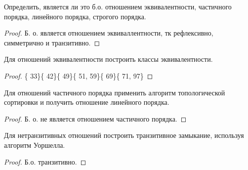 \begin{problem}
	Определить, является ли это б.о. отношением эквивалентности, частичного порядка, линейного порядка, строгого порядка.
\end{problem}

\begin{proof}
	Б. о. является отношением эквиваллентности, тк рефлексивно, симметрично и транзитивно.
\end{proof}
\begin{problem}
	Для отношений эквивалентности построить классы эквивалентности.
\end{problem}

\begin{proof}
\{ 33\}\{ 42\}\{ 49\}\{ 51, 59\}\{ 69\}\{ 71, 97\}
\end{proof}
\begin{problem}
	Для отношений частичного порядка применить алгоритм топологической сортировки и получить отношение линейного порядка.
\end{problem}

\begin{proof}
    Б. о. не является отношением частичного порядка.
\end{proof}
\begin{problem}
	Для нетранзитивных отношений построить транзитивное замыкание, используя алгоритм Уоршелла.
\end{problem}

\begin{proof}
Б.о. транзитивно.
\end{proof}